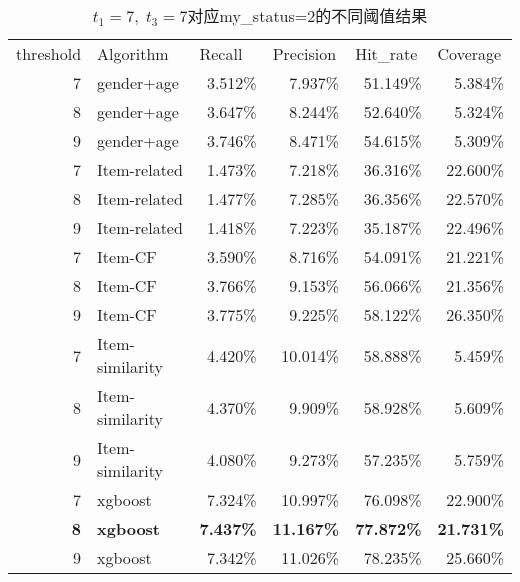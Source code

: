 \begin{table}[htbp]
  \centering
  \caption{$t_1=7,\;t_3=7$对应my\_status=2的不同阈值结果}
    \begin{tabular}{rlrrrr}
    \toprule
    \multicolumn{1}{l}{threshold} & Algorithm & \multicolumn{1}{l}{Recall} & \multicolumn{1}{l}{Precision} & \multicolumn{1}{l}{Hit\_rate} & \multicolumn{1}{l}{Coverage} \\
    7    & gender+age & 3.512\% & 7.937\% & 51.149\% & 5.384\% \\
    8    & gender+age & 3.647\% & 8.244\% & 52.640\% & 5.324\% \\
    9    & gender+age & 3.746\% & 8.471\% & 54.615\% & 5.309\% \\
    7    & Item-related & 1.473\% & 7.218\% & 36.316\% & 22.600\% \\
    8    & Item-related & 1.477\% & 7.285\% & 36.356\% & 22.570\% \\
    9    & Item-related & 1.418\% & 7.223\% & 35.187\% & 22.496\% \\
    7    & Item-CF & 3.590\% & 8.716\% & 54.091\% & 21.221\% \\
    8    & Item-CF & 3.766\% & 9.153\% & 56.066\% & 21.356\% \\
    9    & Item-CF & 3.775\% & 9.225\% & 58.122\% & 26.350\% \\
    7    & Item-similarity & 4.420\% & 10.014\% & 58.888\% & 5.459\% \\
    8    & Item-similarity & 4.370\% & 9.909\% & 58.928\% & 5.609\% \\
    9    & Item-similarity & 4.080\% & 9.273\% & 57.235\% & 5.759\% \\
    7    & xgboost & 7.324\% & 10.997\% & 76.098\% & 22.900\% \\
    \textbf{8} & \textbf{xgboost} & \textbf{7.437\%} & \textbf{11.167\%} & \textbf{77.872\%} & \textbf{21.731\%} \\
    9    & xgboost & 7.342\% & 11.026\% & 78.235\% & 25.660\% \\
    \bottomrule
    \end{tabular}%
  \label{tab:7x78}%
\end{table}%

